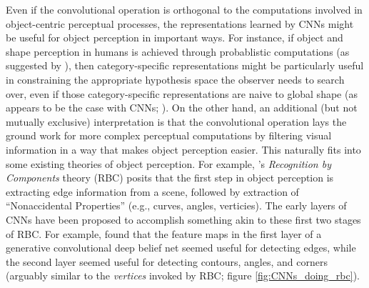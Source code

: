 \documentclass[12pt]{article}
\let\oldcite=\cite
\let\oldtextcite=\textcite
\renewcommand{\cite}[1]{\textcolor[rgb]{0, .121, .388}{\oldcite{#1}}}
\renewcommand{\textcite}[1]{\textcolor[rgb]{0, .121, .388}{\oldtextcite{#1}}}
\begin{document}
Even if the convolutional operation is orthogonal to the computations involved in object-centric perceptual processes, the representations learned by CNNs might be useful for object perception in important ways. For instance, if object and shape perception in humans is achieved through probablistic computations (as suggested by \cite{erdogan2017visual}), then category-specific representations might be particularly useful in constraining the appropriate hypothesis space the observer needs to search over, even if those category-specific representations are naive to global shape (as appears to be the case with CNNs; \cite{baker2018deep}). On the other hand, an additional (but not mutually exclusive) interpretation is that the convolutional operation lays the ground work for more complex perceptual computations by filtering visual information in a way that makes object perception easier. This naturally fits into some existing theories of object perception. For example, \textcite{biederman1987recognition}'s \emph{Recognition by Components} theory (RBC) posits that the first step in object perception is extracting edge information from a scene, followed by extraction of ``Nonaccidental Properties'' (e.g., curves, angles, verticies). The early layers of CNNs have been proposed to accomplish something akin to these first two stages of RBC. For example, \textcite{lee2009convolutional} found that the feature maps in the first layer of a generative convolutional deep belief net seemed useful for detecting edges, while the second layer seemed useful for detecting contours, angles, and corners (arguably similar to the \emph{vertices} invoked by RBC; figure \ref{fig:CNNs_doing_rbc}).
\end{document}
